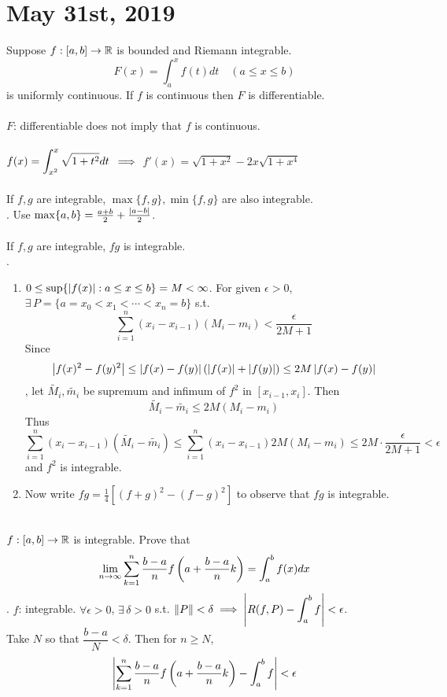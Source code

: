 \section*{May 31st, 2019}
 Suppose $f:[a, b]\rightarrow\mathbb{R}$ is bounded and Riemann integrable.
$$F(x) = \int_a^x f(t)dt \quad (a\leq x\leq b)$$
is uniformly continuous. If $f$ is continuous then $F$ is differentiable.\\
\\
 $F$: differentiable does not imply that $f$ is continuous.\\
\\
 $f(x) = \displaystyle\int_{x^2}^x \sqrt{1+t^2}dt$ $\implies$ $f'(x) = \sqrt{1+x^2}-2x\sqrt{1+x^4}$\\
\\
 If $f, g$ are integrable, $\max\{f, g\}, \min\{f, g\} $ are also integrable.\\
\pf. Use $\max\{a, b\} = \frac{a + b}{2} + \frac{\left|a-b\right|}{2}$.\\
\\
 If $f, g$ are integrable, $fg$ is integrable.\\
\pf.
\begin{enumerate}
	\item $0\leq \sup\{\left|f(x)\right|: a \leq x\leq b\} = M < \infty$. For given $\epsilon>0$, $\exists\, P = \{a = x_0 < x_1 < \cdots < x_n=b\}$ s.t.
	$$\sum_{i=1}^n(x_{i}-x_{i-1})(M_i-m_i) < \frac{\epsilon}{2M+1}$$
	Since $$\left|f(x)^2 - f(y)^2\right| \leq \left|f(x)-f(y)\right|(\left|f(x)\right| + \left|f(y)\right|) \leq 2M\left|f(x)-f(y)\right|$$
	, let $\widetilde{M_i}, \widetilde{m_i}$ be supremum and infimum of $f^2$ in $[x_{i-1}, x_i]$. Then $$\widetilde{M_i} - \widetilde{m_i} \leq 2M(M_i-m_i)$$
	Thus $$ \sum_{i=1}^n(x_{i}-x_{i-1})(\widetilde{M_i} - \widetilde{m_i}) \leq \sum_{i=1}^n (x_{i} - x_{i-1}) 2M(M_i -m_i) \leq 2M \cdot \frac{\epsilon}{2M+1} < \epsilon $$
	and $f^2$ is integrable.
	\item Now write $fg = \frac{1}{4}[(f+g)^2-(f-g)^2]$ to observe that $fg$ is integrable.
\end{enumerate}~\\
 $f:[a, b]\rightarrow\mathbb{R}$ is integrable. Prove that
$$\lim_{n\rightarrow\infty} \sum_{k=1}^n \frac{b-a}{n}f\left(a + \frac{b-a}{n}k\right) = \int_a^b f(x)dx$$
\pf. $f$: integrable. $\forall \epsilon > 0$, $\exists\,\delta > 0$ s.t. $\left\lVert P\right\rVert < \delta \implies \left|R(f, P) - \displaystyle \int_a^b f\right| < \epsilon$.\\
Take $N$ so that $\dfrac{b-a}{N} < \delta$. Then for $n\geq N$, $$\left|\sum_{k=1}^n \frac{b-a}{n}f\left(a + \frac{b-a}{n}k\right) - \int_a^b f\right| < \epsilon$$
